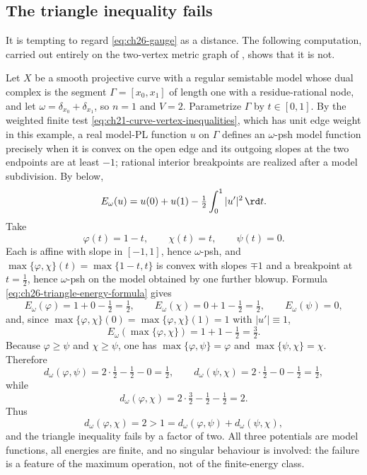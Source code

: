 \subsection{The triangle inequality fails}
\label{sec:ch26-triangle}

It is tempting to regard \eqref{eq:ch26-gauge} as a distance.  The following
computation, carried out entirely on the two-vertex metric graph of
, shows that it is not.

\begin{example}
\label{ex:ch26-triangle-fails}
Let $X$ be a smooth projective curve with a regular semistable model whose
dual complex is the segment $\Gamma=[x_0,x_1]$ of length one with a
residue-rational node, and let
$\omega=\delta_{x_0}+\delta_{x_1}$, so $n=1$ and $V=2$.  Parametrize
$\Gamma$ by $t\in[0,1]$.  By the weighted finite test
\eqref{eq:ch21-curve-vertex-inequalities}, which has unit edge weight in
this example, a real model-PL function $u$ on $\Gamma$ defines an
$\omega$-psh model function precisely when it is convex on the open edge
and its outgoing slopes at the two endpoints are at least $-1$; rational
interior breakpoints are realized after a model subdivision.  By
 below,
\begin{equation}
\label{eq:ch26-triangle-energy-formula}
 E_\omega(u)=u(0)+u(1)-\tfrac12\int_0^1|u'|^2\,\rd t .
\end{equation}
Take
\[
 \varphi(t)=1-t,\qquad
 \chi(t)=t,\qquad
 \psi(t)=0 .
\]
Each is affine with slope in $[-1,1]$, hence $\omega$-psh, and
$\max\{\varphi,\chi\}(t)=\max\{1-t,t\}$ is convex with slopes $\mp1$ and
a breakpoint at $t=\tfrac12$, hence $\omega$-psh on the model obtained by
one further blowup.  Formula \eqref{eq:ch26-triangle-energy-formula} gives
\[
 E_\omega(\varphi)=1+0-\tfrac12=\tfrac12,
 \qquad
 E_\omega(\chi)=0+1-\tfrac12=\tfrac12,
 \qquad
 E_\omega(\psi)=0,
\]
and, since $\max\{\varphi,\chi\}(0)=\max\{\varphi,\chi\}(1)=1$ with
$|u'|\equiv1$,
\[
 E_\omega(\max\{\varphi,\chi\})=1+1-\tfrac12=\tfrac32 .
\]
Because $\varphi\geq\psi$ and $\chi\geq\psi$, one has
$\max\{\varphi,\psi\}=\varphi$ and $\max\{\psi,\chi\}=\chi$.  Therefore
\[
 d_\omega(\varphi,\psi)=2\cdot\tfrac12-\tfrac12-0=\tfrac12,
 \qquad
 d_\omega(\psi,\chi)=2\cdot\tfrac12-0-\tfrac12=\tfrac12,
\]
while
\[
 d_\omega(\varphi,\chi)=2\cdot\tfrac32-\tfrac12-\tfrac12=2 .
\]
Thus
\[
 d_\omega(\varphi,\chi)=2
 >1=d_\omega(\varphi,\psi)+d_\omega(\psi,\chi),
\]
and the triangle inequality fails by a factor of two.  All three potentials
are model functions, all energies are finite, and no singular behaviour is
involved: the failure is a feature of the maximum operation, not of the
finite-energy class.


\end{example}
